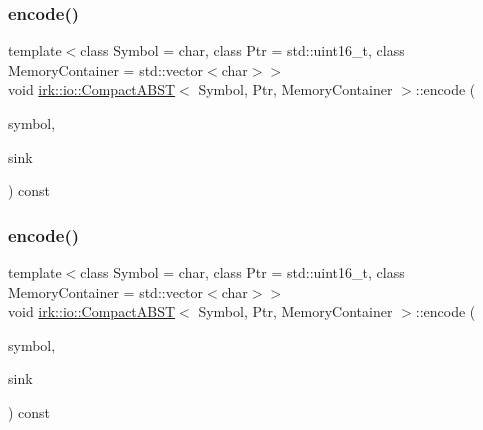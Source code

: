 \mbox{\label{classirk_1_1io_1_1CompactABST_a41ec0899895d07a801088fb7bd12292f}} 
\subsubsection{\texorpdfstring{encode()}{encode()}\hspace{0.1cm}{\footnotesize\ttfamily [1/3]}}
{\footnotesize\ttfamily template$<$class Symbol = char, class Ptr = std\+::uint16\+\_\+t, class Memory\+Container = std\+::vector$<$char$>$$>$ \\
void \mbox{\hyperlink{classirk_1_1io_1_1CompactABST}{irk\+::io\+::\+Compact\+A\+B\+ST}}$<$ Symbol, Ptr, Memory\+Container $>$\+::encode (\begin{DoxyParamCaption}\item[{Symbol}]{symbol,  }\item[{Output\+Bit\+Stream \&}]{sink }\end{DoxyParamCaption}) const\hspace{0.3cm}{\ttfamily [inline]}}

\mbox{\label{classirk_1_1io_1_1CompactABST_aaa86fe71000a2446039b03e22ffc282b}} 
\subsubsection{\texorpdfstring{encode()}{encode()}\hspace{0.1cm}{\footnotesize\ttfamily [2/3]}}
{\footnotesize\ttfamily template$<$class Symbol = char, class Ptr = std\+::uint16\+\_\+t, class Memory\+Container = std\+::vector$<$char$>$$>$ \\
void \mbox{\hyperlink{classirk_1_1io_1_1CompactABST}{irk\+::io\+::\+Compact\+A\+B\+ST}}$<$ Symbol, Ptr, Memory\+Container $>$\+::encode (\begin{DoxyParamCaption}\item[{Symbol}]{symbol,  }\item[{boost\+::dynamic\+\_\+bitset$<$ unsigned char $>$ \&}]{sink }\end{DoxyParamCaption}) const\hspace{0.3cm}{\ttfamily [inline]}}

